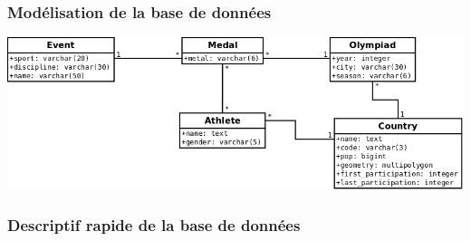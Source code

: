 \documentclass{article}
\begin{document}
\subsubsection{Modélisation de la base de données}

\includegraphics[width=\textwidth]{bdd.png}

\newpage

\subsubsection{Descriptif rapide de la base de données}
\end{document}

